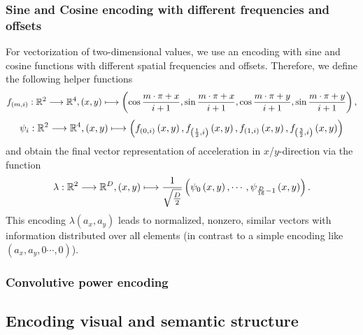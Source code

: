 \subsubsection{Sine and Cosine encoding with different frequencies and offsets}
For vectorization of two-dimensional values, we use an encoding with sine and cosine functions with different spatial frequencies and offsets.
Therefore, we define the following helper functions
\[ f_{\left(m,i\right)}: \mathbb{R}^2 \longrightarrow \mathbb{R}^4, \left(x,y\right) \longmapsto \left(\cos\frac{m\cdot \pi + x}{i + 1}, \sin\frac{m\cdot \pi + x}{i + 1}, \cos\frac{m\cdot \pi + y}{i + 1}, \sin\frac{m\cdot \pi + y}{i + 1}\right),
\]
\[
\psi_i: \mathbb{R}^2 \longrightarrow \mathbb{R}^4, \left(x,y\right) \longmapsto \left(f_{\left(0,i\right)}\left(x,y\right), f_{\left(\frac{1}{2},i\right)}\left(x,y\right), f_{\left(1,i\right)}\left(x,y\right), f_{\left(\frac{3}{2},i\right)}\left(x,y\right)\right)
\]
and obtain the final vector representation of acceleration in $x$/$y$-direction via the function
\[
\lambda: \mathbb{R}^2 \longrightarrow \mathbb{R}^D, \left(x,y\right) \longmapsto \frac{1}{\sqrt{\frac{D}{2}}}\left(\psi_0\left(x,y\right), \cdots, \psi_{\frac{D}{16}-1}\left(x,y\right)\right).
\]
This encoding $\lambda\left(a_x, a_y\right)$ leads to normalized, nonzero, similar vectors with information distributed over all elements (in contrast to a simple encoding like $\left(a_x, a_y, 0 \cdots, 0\right)$).
\subsubsection{Convolutive power encoding}
\subsection{Encoding visual and semantic structure}
